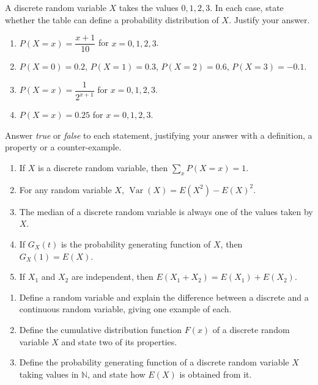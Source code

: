 \documentclass[11pt]{article}
\newcommand{\cle}[1]{{\popxbold\color{popdark}#1}}
\begin{document}
\begin{exercice}
A discrete random variable $X$ takes the values $0, 1, 2, 3$. In each case, state whether the table can define a probability distribution of $X$. Justify your answer.
\begin{enumerate}
\item $P(X=x) = \dfrac{x+1}{10}$ for $x = 0, 1, 2, 3$.
\item $P(X=0) = 0.2$, $P(X=1) = 0.3$, $P(X=2) = 0.6$, $P(X=3) = -0.1$.
\item $P(X=x) = \dfrac{1}{2^{x+1}}$ for $x = 0, 1, 2, 3$.
\item $P(X=x) = 0.25$ for $x = 0, 1, 2, 3$.
\end{enumerate}
\end{exercice}

\begin{exercice}
Answer \emph{true} or \emph{false} to each statement, justifying your answer with a definition, a property or a counter-example.
\begin{enumerate}
\item If $X$ is a discrete random variable, then $\sum_x P(X = x) = 1$.
\item For any random variable $X$, $\operatorname{Var}(X) = E(X^2) - E(X)^2$.
\item The median of a discrete random variable is always one of the values taken by $X$.
\item If $G_X(t)$ is the probability generating function of $X$, then $G_X(1) = E(X)$.
\item If $X_1$ and $X_2$ are independent, then $E(X_1 + X_2) = E(X_1) + E(X_2)$.
\end{enumerate}
\end{exercice}

\begin{exercice}
\begin{enumerate}
\item Define a \cle{random variable} and explain the difference between a discrete and a continuous random variable, giving one example of each.
\item Define the \cle{cumulative distribution function} $F(x)$ of a discrete random variable $X$ and state two of its properties.
\item Define the \cle{probability generating function} of a discrete random variable $X$ taking values in $\mathbb{N}$, and state how $E(X)$ is obtained from it.
\end{enumerate}
\end{exercice}
\end{document}
